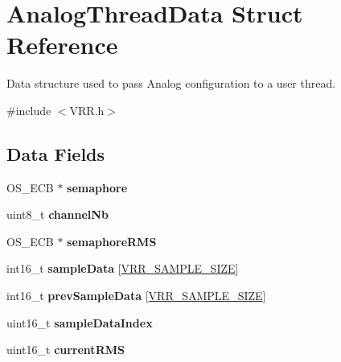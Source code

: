 \hypertarget{struct_analog_thread_data}{}\section{Analog\+Thread\+Data Struct Reference}
\label{struct_analog_thread_data}


Data structure used to pass Analog configuration to a user thread.  




{\ttfamily \#include $<$V\+R\+R.\+h$>$}

\subsection*{Data Fields}
\begin{DoxyCompactItemize}
\item 
\hypertarget{struct_analog_thread_data_a02d829e2506377585485044548fc85e2}{}O\+S\+\_\+\+E\+C\+B $\ast$ {\bfseries semaphore}\label{struct_analog_thread_data_a02d829e2506377585485044548fc85e2}

\item 
\hypertarget{struct_analog_thread_data_a896bcccdd678ec542be06dcb6cc91031}{}uint8\+\_\+t {\bfseries channel\+Nb}\label{struct_analog_thread_data_a896bcccdd678ec542be06dcb6cc91031}

\item 
\hypertarget{struct_analog_thread_data_adb1274c00925e05895786fcab8990834}{}O\+S\+\_\+\+E\+C\+B $\ast$ {\bfseries semaphore\+R\+M\+S}\label{struct_analog_thread_data_adb1274c00925e05895786fcab8990834}

\item 
\hypertarget{struct_analog_thread_data_a27c4b49c9237b04d653cb9ac139ecb40}{}int16\+\_\+t {\bfseries sample\+Data} \mbox{[}\hyperlink{_v_r_r_8h_a217a973f4d9c03d02faa87abec73b213}{V\+R\+R\+\_\+\+S\+A\+M\+P\+L\+E\+\_\+\+S\+I\+Z\+E}\mbox{]}\label{struct_analog_thread_data_a27c4b49c9237b04d653cb9ac139ecb40}

\item 
\hypertarget{struct_analog_thread_data_a03d19dda6515e3bae6ce0fc725127ff1}{}int16\+\_\+t {\bfseries prev\+Sample\+Data} \mbox{[}\hyperlink{_v_r_r_8h_a217a973f4d9c03d02faa87abec73b213}{V\+R\+R\+\_\+\+S\+A\+M\+P\+L\+E\+\_\+\+S\+I\+Z\+E}\mbox{]}\label{struct_analog_thread_data_a03d19dda6515e3bae6ce0fc725127ff1}

\item 
\hypertarget{struct_analog_thread_data_aa22eeefd82b49779658151a1ac8a63ce}{}uint16\+\_\+t {\bfseries sample\+Data\+Index}\label{struct_analog_thread_data_aa22eeefd82b49779658151a1ac8a63ce}

\item 
\hypertarget{struct_analog_thread_data_af8abf131ca4e6ab3b135f728b265dcbb}{}uint16\+\_\+t {\bfseries current\+R\+M\+S}\label{struct_analog_thread_data_af8abf131ca4e6ab3b135f728b265dcbb}

\end{DoxyCompactItemize}


